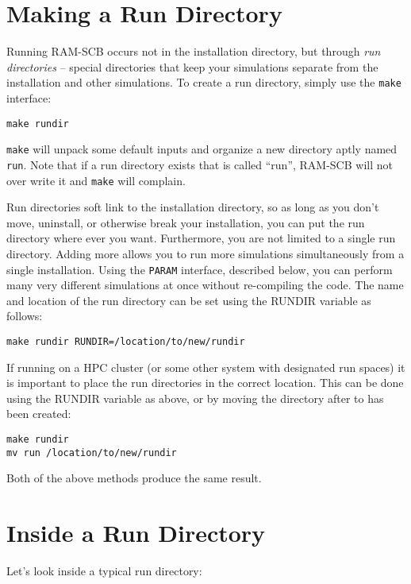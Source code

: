 
\section{Making a Run Directory}
Running RAM-SCB occurs not in the installation directory, but through \textit{run directories} -- special directories that keep your simulations separate from the installation and other simulations. To create a run directory, simply use the {\tt make} interface:
\begin{verbatim}
make rundir
\end{verbatim}
\noindent
{\tt make} will unpack some default inputs and organize a new directory aptly named {\tt run}. Note that if a run directory exists that is called ``run'', RAM-SCB will not over write it and {\tt make} will complain. 

Run directories soft link to the installation directory, so as long as you don't move, uninstall, or otherwise break your installation, you can put the run directory where ever you want. Furthermore, you are not limited to a single run directory. Adding more allows you to run more simulations simultaneously from a single installation. Using the {\tt PARAM} interface, described below, you can perform many very different simulations at once without re-compiling the code. The name and location of the run directory can be set using the RUNDIR variable as follows:
\begin{verbatim}
make rundir RUNDIR=/location/to/new/rundir
\end{verbatim}
\noindent

If running on a HPC cluster (or some other system with designated run spaces) it is important to place the run directories in the correct location. This can be done using the RUNDIR variable as above, or by moving the directory after to has been created:
\begin{verbatim}
make rundir
mv run /location/to/new/rundir
\end{verbatim}
\noindent

Both of the above methods produce the same result.

\section{Inside a Run Directory}
Let's look inside a typical run directory:

